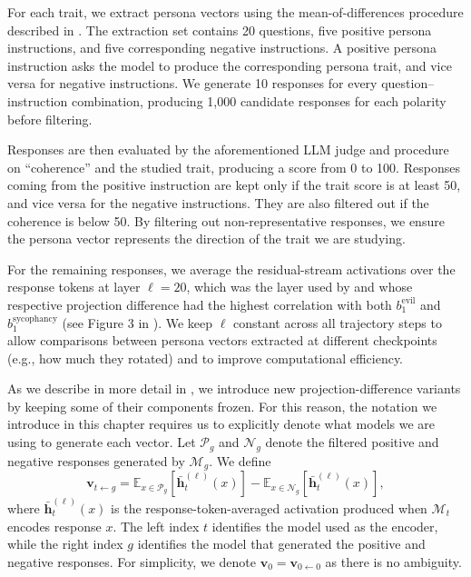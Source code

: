 For each trait, we extract persona vectors using the mean-of-differences procedure described in . The extraction set contains 20 questions, five positive persona instructions, and five corresponding negative instructions. A positive persona instruction asks the model to produce the corresponding persona trait, and vice versa for negative instructions. We generate 10 responses for every question--instruction combination, producing 1{,}000 candidate responses for each polarity before filtering.

Responses are then evaluated by the aforementioned LLM judge and procedure on ``coherence'' and the studied trait, producing a score from 0 to 100. Responses coming from the positive instruction are kept only if the trait score is at least 50, and vice versa for the negative instructions. They are also filtered out if the coherence is below 50. By filtering out non-representative responses, we ensure the persona vector represents the direction of the trait we are studying. 

For the remaining responses, we average the residual-stream activations over the response tokens at layer $\ell=20$, which was the layer used by \citet{chen2025persona_vectors} and whose respective projection difference had the highest correlation with both $b^{\text{evil}}_1$ and $b^{\text{sycophancy}}_1$ (see Figure 3 in \citet{chen2025persona_vectors}). We keep $\ell$ constant across all trajectory steps to allow comparisons between persona vectors extracted at different checkpoints (e.g., how much they rotated) and to improve computational efficiency.

As we describe in more detail in , we introduce new projection-difference variants by keeping some of their components frozen. For this reason, the notation we introduce in this chapter requires us to explicitly denote what models we are using to generate each vector. Let $\mathcal{P}_g$ and $\mathcal{N}_g$ denote the filtered positive and negative responses generated by $\mathcal{M}_g$. We define
\begin{equation}
\mathbf{v}_{t\leftarrow g}
=
\mathbb{E}_{x\in\mathcal{P}_g}
\left[\bar{\mathbf{h}}^{(\ell)}_t(x)\right]
-
\mathbb{E}_{x\in\mathcal{N}_g}
\left[\bar{\mathbf{h}}^{(\ell)}_t(x)\right],
\label{eq:persona-vector-source}
\end{equation}
where $\bar{\mathbf{h}}^{(\ell)}_t(x)$ is the response-token-averaged activation produced when $\mathcal{M}_t$ encodes response $x$. The left index $t$ identifies the model used as the encoder, while the right index $g$ identifies the model that generated the positive and negative responses. For simplicity, we denote $\mathbf{v}_0 = \mathbf{v}_{0\leftarrow0}$ as there is no ambiguity. 

